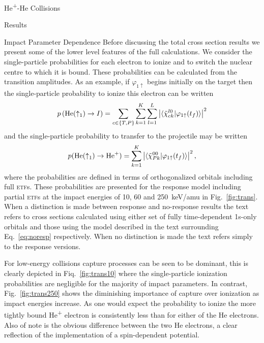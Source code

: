 \documentclass[letterpaper, 11 pt]{report}
\begin{document}
\begin{chapter}{\texorpdfstring{He\textsuperscript{+}}{He+}-He Collisions \label{chap:hephe}}
\begin{section}{Results \label{sec:hephe-disc}}
\begin{subsection}{Impact Parameter Dependence \label{sec:hephepb}}
         Before discussing the total cross section results we present some of the lower level features
         of the full calculations. We consider the single-particle probabilities for each electron to
         ionize and to switch the nuclear centre to which it is bound. These probabilities can be
         calculated from the transition amplitudes. As an example, if $\varphi_{1 \uparrow}$ begins
         initially on the target then the single-particle probability to ionize this electron can be
         written
         \begin{equation} \label{eq:ionprob}
            p \left( \mathrm{He}(\uparrow_1) \rightarrow I \right) =
               \sum\limits_{c \in \{T,P\}} \sum\limits_{k=1}^K \sum\limits_{l = 1}^L
               \left| \braket{ \tilde{\chi}^{l0}_{c k} | \varphi_{1 \uparrow}(t_f)} \right|^2
         \end{equation}
         and the single-particle probability to transfer to the projectile may be written
         \begin{equation} \label{eq:transprob}
            p(\mathrm{He}(\uparrow_1) \rightarrow \mathrm{He}^+) =
               \sum\limits_{k=1}^K \left| \braket{ \tilde{\chi}^{00}_{P k} | \varphi_{1 \uparrow}(t_f)}
                          \right|^2,
         \end{equation}
         where the probabilities are defined in terms of orthogonalized orbitals including full
         \textsc{etf}s. These probabilities are presented for the response model including partial
         \textsc{etf}s at the impact energies of 10, 60 and 250~keV/amu in Fig.~\ref{fig:trans}. When a
         distinction is made between response and no-response results the text refers to cross sections
         calculated using either set of fully time-dependent 1s-only orbitals and those using the model
         described in the text surrounding Eq.~\eqref{eq:noresp} respectively. When no distinction is
         made the text refers simply to the response versions.

         For low-energy collisions capture processes can be seen to be dominant, this is clearly
         depicted in Fiq.~\ref{fig:trans10} where the single-particle ionization probabilities are
         negligible for the majority of impact parameters. In contrast, Fig.~\ref{fig:trans250}
         shows the diminishing importance of capture over ionization as impact energies increase.
         As one would expect the probability to ionize the more tightly bound He\textsuperscript{+}
         electron is consistently less than for either of the He electrons. Also of note is the obvious
         difference between the two He electrons, a clear reflection of the implementation of a
         spin-dependent potential.


\end{subsection}
\end{section}
\end{chapter}
\end{document}
